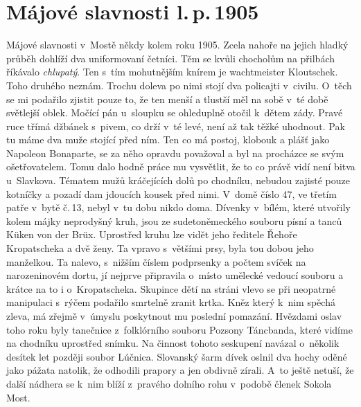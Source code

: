 
\chapter{Májové slavnosti l.\,p.\,1905}

Májové slavnosti v~Mostě někdy kolem roku 1905. Zcela nahoře na jejich
hladký průběh dohlíží dva uniformovaní četníci. Těm se kvůli chocholům
na přilbách říkávalo {\em chlupatý}. Ten s~tím mohutnějším knírem je
wachtmeister Kloutschek. Toho druhého neznám. Trochu doleva po nimi
stojí dva policajti v~civilu. O~těch se mi podařilo zjistit pouze to,
že ten menší a tlustší měl na sobě v~té době světlejší oblek. Močící
pán u~sloupku se ohleduplně otočil k~dětem zády. Pravé ruce třímá
džbánek s~pivem, co drží v~té levé, není až tak těžké uhodnout. Pak tu
máme dva muže stojící před ním. Ten co má postoj, klobouk a plášť
jako Napoleon Bonaparte, se za něho opravdu považoval a byl na
procházce se svým ošetřovatelem. Tomu dalo hodně práce mu vysvětlit,
že to co právě vidí není bitva u~Slavkova. Tématem mužů kráčejících
dolů po chodníku, nebudou zajisté pouze kotníčky a pozadí dam jdoucích
kousek před nimi. V~domě číslo 47, ve třetím patře v~bytě č.\,13, nebyl
v~tu dobu nikdo doma. Dívenky v~bílém, které utvořily kolem májky
neprodyšný kruh, jsou ze sudetoněmeckého souboru písní a tanců Küken
von der Brüx. Uprostřed kruhu lze vidět jeho ředitele Řehoře
Kropatscheka a dvě ženy. Ta vpravo s~většími prsy, byla tou dobou jeho
manželkou. Ta nalevo, s~nižším číslem podprsenky a počtem svíček na
narozeninovém dortu, jí nejprve připravila o~místo umělecké vedoucí
souboru a krátce na to i o~Kropatscheka. Skupince dětí na stráni vlevo
se při neopatrné manipulaci s~rýčem podařilo smrtelně zranit krtka.
Kněz který k~nim spěchá zleva, má zřejmě v~úmyslu poskytnout mu
poslední pomazání. Hvězdami oslav toho roku byly tanečnice
z~folklórního souboru Pozsony Táncbanda, které vidíme na chodníku
uprostřed snímku. Na činnost tohoto seskupení navázal o~několik
desítek let později soubor Lúčnica. Slovanský šarm dívek oslnil dva
hochy oděné jako pážata natolik, že odhodili prapory a jen obdivně
zírali. A~to ještě netuší, že další nádhera se k~nim blíží z~pravého
dolního rohu v~podobě členek Sokola Most.

